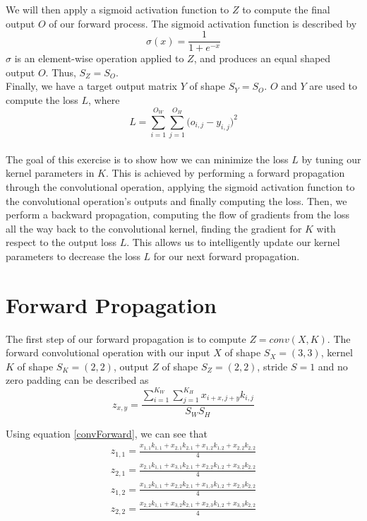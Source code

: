 \documentclass[english,notitlepage,reprint]{revtex4-1}
\begin{document}
We will then apply a sigmoid activation function to $Z$ to compute the final output $O$ of our forward process.
The sigmoid activation function is described by
\begin{equation}\label{sigmoid}
  \sigma(x)=\frac{1}{1+e^{-x}}
\end{equation}
$\sigma$ is an element-wise operation applied to $Z$, and produces an equal shaped output $O$.
Thus, $S_Z=S_O$.\\

Finally, we have a target output matrix $Y$ of shape $S_Y=S_O$.
$O$ and $Y$ are used to compute the loss $L$, where
\begin{equation}\label{loss}
  L=\sum_{i=1}^{O_W}{\sum_{j=1}^{O_H}{(o_{i,j}}-y_{i,j})^2}
\end{equation}\\

The goal of this exercise is to show how we can minimize the loss $L$ by tuning our kernel parameters in $K$.
This is achieved by performing a forward propagation through the convolutional operation, applying the sigmoid activation function to the convolutional operation's outputs and finally computing the loss.
Then, we perform a backward propagation, computing the flow of gradients from the loss all the way back to the convolutional kernel, finding the gradient for $K$ with respect to the output loss $L$.
This allows us to intelligently update our kernel parameters to decrease the loss $L$ for our next forward propagation.

\section{Forward Propagation}
The first step of our forward propagation is to compute $Z=conv(X,K)$.
The forward convolutional operation with our input $X$ of shape $S_X=(3,3)$, kernel $K$ of shape $S_K=(2,2)$, output $Z$ of shape $S_Z=(2,2)$, stride $S=1$ and no zero padding can be described as
\begin{equation}\label{convForward}
  z_{x,y}=
    \frac{
      \sum_{i=1}^{K_W}{
        \sum_{j=1}^{K_H}{
          x_{i+x,j+y}k_{i,j}
        }
      }
    }
    {
      S_WS_H
    }
\end{equation}

Using equation \ref{convForward}, we can see that
\begin{align*}
  z_{1,1}=\frac{x_{1,1}k_{1,1}+x_{2,1}k_{2,1}+x_{1,2}k_{1,2}+x_{2,2}k_{2,2}}{4}\\
  z_{2,1}=\frac{x_{2,1}k_{1,1}+x_{3,1}k_{2,1}+x_{2,2}k_{1,2}+x_{3,2}k_{2,2}}{4}\\
  z_{1,2}=\frac{x_{1,2}k_{1,1}+x_{2,2}k_{2,1}+x_{1,3}k_{1,2}+x_{2,3}k_{2,2}}{4}\\
  z_{2,2}=\frac{x_{2,2}k_{1,1}+x_{3,2}k_{2,1}+x_{2,3}k_{1,2}+x_{3,3}k_{2,2}}{4}
\end{align*}
\end{document}
